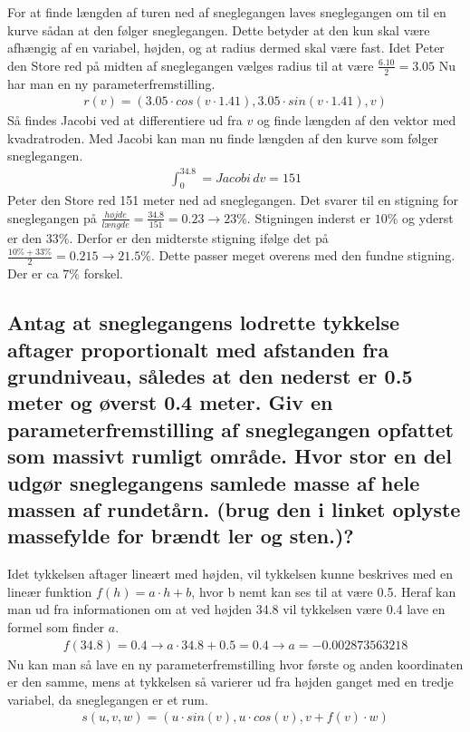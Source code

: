 For at finde længden af turen ned af sneglegangen laves sneglegangen om til en kurve sådan at den følger sneglegangen. Dette betyder at den kun skal være afhængig af en variabel, højden, og at radius dermed skal være fast. Idet Peter den Store red på midten af sneglegangen vælges radius til at være $\frac{6.10}{2} = 3.05$
Nu har man en ny parameterfremstilling.
\begin{align}
    r(v) = (3.05 \cdot cos(v \cdot 1.41), 3.05 \cdot sin(v\cdot 1.41), v)
\end{align}
Så findes Jacobi ved at differentiere ud fra $v$ og finde længden af den vektor med kvadratroden. 
Med Jacobi kan man nu finde længden af den kurve som følger sneglegangen.
\begin{align}
    \int^{34.8}_0 = Jacobi \,dv = 151
\end{align}
Peter den Store red 151 meter ned ad sneglegangen. Det svarer til en stigning for sneglegangen på $\frac{højde}{længde}=\frac{34.8}{151} = 0.23 \rightarrow 23\%$. 
Stigningen inderst er $10\%$ og yderst er den $33\%$. Derfor er den midterste stigning ifølge det på $\frac{10\%+33\%}{2}=0.215 \rightarrow 21.5\%$. Dette passer meget overens med den fundne stigning. Der er ca $7\%$ forskel.  

\subsection{Antag at sneglegangens lodrette tykkelse aftager proportionalt med afstanden fra grundniveau, således at den nederst er 0.5 meter og øverst 0.4 meter. Giv en parameterfremstilling af sneglegangen opfattet som massivt rumligt område. Hvor stor en del udgør sneglegangens samlede masse af hele massen af rundetårn. (brug den i linket oplyste massefylde for brændt ler og sten.)?}

Idet tykkelsen aftager lineært med højden, vil tykkelsen kunne beskrives med en lineær funktion $f(h)=a \cdot h + b$, hvor b nemt kan ses til at være 0.5. Heraf kan man ud fra informationen om at ved højden 34.8 vil tykkelsen være 0.4 lave en formel som finder $a$.
\begin{align}
    f(34.8) = 0.4 \rightarrow a \cdot 34.8 + 0.5 = 0.4 \rightarrow a = -0.002873563218
\end{align}
Nu kan man så lave en ny parameterfremstilling hvor første og anden koordinaten er den samme, mens at tykkelsen så varierer ud fra højden ganget med en tredje variabel, da sneglegangen er et rum.
\begin{align}
    s(u,v,w) = (u \cdot sin(v),u \cdot cos(v),v + f(v) \cdot w)
\end{align}


